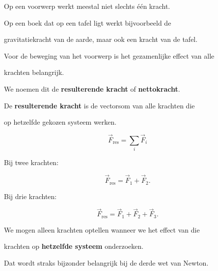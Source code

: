 \documentclass{ximera}
\begin{document}




Op een voorwerp werkt meestal niet slechts één kracht.

Op een boek dat op een tafel ligt werkt bijvoorbeeld de

gravitatiekracht van de aarde, maar ook een kracht van de tafel.

Voor de beweging van het voorwerp is het gezamenlijke effect van alle

krachten belangrijk.

We noemen dit de \textbf{resulterende kracht} of \textbf{nettokracht}.


\begin{definitie}

De \textbf{resulterende kracht} is de vectorsom van alle krachten die

op hetzelfde gekozen systeem werken.

\[\boxed{ \vec F_{\mathrm{res}} = \sum_i\vec F_i }\]

\end{definitie}


Bij twee krachten:

\[\vec F_{\mathrm{res}} = \vec F_1+\vec F_2.\]

Bij drie krachten:

\[\vec F_{\mathrm{res}} = \vec F_1+\vec F_2+\vec F_3.\]


\begin{opmerking}

We mogen alleen krachten optellen wanneer we het effect van die

krachten op \textbf{hetzelfde systeem} onderzoeken.

Dat wordt straks bijzonder belangrijk bij de derde wet van Newton.

\end{opmerking}
\end{document}
